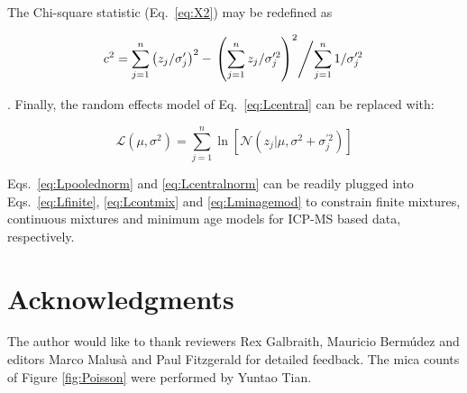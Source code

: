 \documentclass{article}
\begin{document}
The Chi-square statistic (Eq.~\ref{eq:X2}) may be redefined as

\begin{equation}
  c^2 = \sum\limits_{j=1}^{n} \left( z_j/\sigma'_j \right)^2  -
  \left.
  \left( \sum\limits_{j=1}^{n} z_j/\sigma'^2_j \right)^2
  \middle/
    \sum\limits_{j=1}^{n}
    1/\sigma'^2_j
  \right.
\end{equation}

\citep{galbraith2010b}. Finally, the random effects model of
Eq.~\ref{eq:Lcentral} can be replaced with:

\begin{equation}
\mathcal{L}(\mu,\sigma^2) = \sum\limits_{j=1}^{n} \ln \left[
  \mathcal{N}(z_j|\mu,\sigma^2+\sigma_j^{\prime 2}) \right]
\label{eq:Lcentralnorm}
\end{equation}

Eqs.~\ref{eq:Lpoolednorm} and \ref{eq:Lcentralnorm} can be readily
plugged into Eqs.~\ref{eq:Lfinite}, \ref{eq:Lcontmix} and
\ref{eq:Lminagemod} to constrain finite mixtures, continuous mixtures
and minimum age models for ICP-MS based data, respectively.

\section*{Acknowledgments}

The author would like to thank reviewers Rex Galbraith, Mauricio
Berm\'{u}dez and editors Marco Malus\`{a} and Paul Fitzgerald for
detailed feedback.  The mica counts of Figure \ref{fig:Poisson} were
performed by Yuntao Tian.
\end{document}
